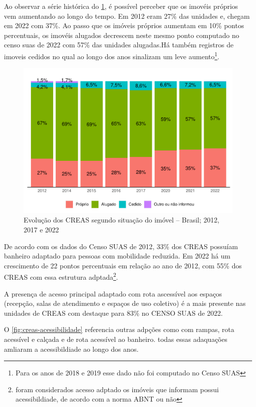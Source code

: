 \documentclass[
  brazilian]{report}
\begin{document}
Ao observar a série histórica do \cref{fig:creas-situacao}, é possível
perceber que os imovéis próprios vem aumentando ao longo do tempo. Em
2012 eram 27\% das unidades e, chegam em 2022 com 37\%. Ao passo que os
imóveis próprios aumentam em 10\% pontos percentuais, os imovéis
alugados decrescem neste mesmo ponto computado no censo suas de 2022 com
57\% das unidades alugadas.Há também registros de imoveis cedidos no
qual ao longo dos anos sinalizam um leve
aumento\footnote{Para os anos de 2018 e 2019 esse dado não foi computado no Censo SUAS}.

\begin{figure}
\includegraphics{Censo-SUAS-2022_files/figure-latex/creas-situacao-1} \caption[Evolução dos CREAS segundo situação do imóvel – Brasil]{Evolução dos CREAS segundo situação do imóvel – Brasil; 2012, 2017 e 2022}\label{fig:creas-situacao}
\end{figure}

De acordo com os dados do Censo SUAS de 2012, 33\% dos CREAS possuíam
banheiro adaptado para pessoas com mobilidade reduzida. Em 2022 há um
crescimento de 22 pontos percentuais em relação ao ano de 2012, com 55\%
dos CREAS com essa estrutura
adptada\footnote{foram considerados acesso adptado os imóveis que informam possui acessibildiade, de acordo com a norma ABNT ou não}.

A presença de acesso principal adaptado com rota ascessível aos espaços
(recepção, salas de atendimento e espaços de uso coletivo) é a mais
presente nas unidades de CREAS com destaque para 83\% no CENSO SUAS de
2022.

O \cref{fig:creas-acessibilidade} referencia outras adpções como com
rampas, rota acessível e calçada e de rota acessível ao banheiro. todas
essas adaquações amliaram a acessibildiade ao longo dos anos.
\end{document}
